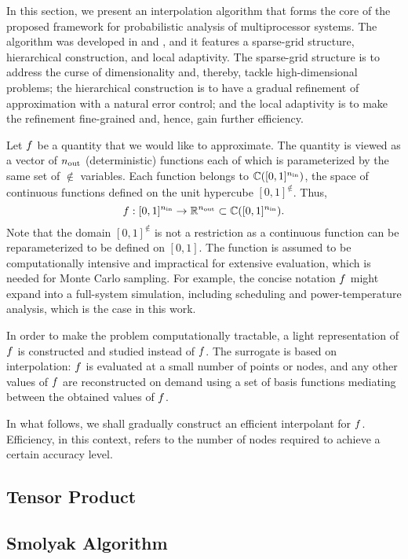 In this section, we present an interpolation algorithm that forms the core of
the proposed framework for probabilistic analysis of multiprocessor systems. The
algorithm was developed in \cite{klimke2006} and \cite{ma2009}, and it features
a sparse-grid structure, hierarchical construction, and local adaptivity. The
sparse-grid structure is to address the curse of dimensionality and, thereby,
tackle high-dimensional problems; the hierarchical construction is to have a
gradual refinement of approximation with a natural error control; and the local
adaptivity is to make the refinement fine-grained and, hence, gain further
efficiency.

Let $f$ be a quantity that we would like to approximate. The quantity is viewed
as a vector of ${n_\text{out}}$ (deterministic) functions each of which is parameterized
by the same set of $\nin$ variables. Each function belongs to $\mathbb{C}([0,
1]^{n_\text{in}})$, the space of continuous functions defined on the unit hypercube $[0,
1]^\nin$. Thus,
\[
  f: [0, 1]^{n_\text{in}} \to \mathbb{R}^{n_\text{out}} \subset \mathbb{C}([0, 1]^{n_\text{in}}).
\]
Note that the domain $[0, 1]^\nin$ is not a restriction as a continuous function
can be reparameterized to be defined on $[0, 1]$. The function is assumed to be
computationally intensive and impractical for extensive evaluation, which is
needed for Monte Carlo sampling. For example, the concise notation $f$ might
expand into a full-system simulation, including scheduling and power-temperature
analysis, which is the case in this work.

In order to make the problem computationally tractable, a light representation
of $f$ is constructed and studied instead of $f$. The surrogate is based on
interpolation: $f$ is evaluated at a small number of points or nodes, and any
other values of $f$ are reconstructed on demand using a set of basis functions
mediating between the obtained values of $f$.

In what follows, we shall gradually construct an efficient interpolant for $f$.
Efficiency, in this context, refers to the number of nodes required to achieve a
certain accuracy level.

\subsection{Tensor Product} 


\subsection{Smolyak Algorithm} 


